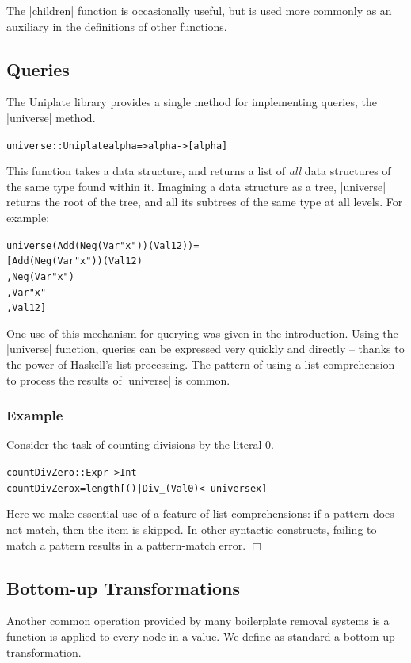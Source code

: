 \documentclass[preprint]{sigplanconf}
\newcounter{exmp}
\newcommand{\yesexample}{\subsubsection*{Example \arabic{exmp}}\refstepcounter{exmp}}
\newcommand{\noexample}{\hfill$\Box$}
\newenvironment{code}{\begin{alltt}\small}{\end{alltt}}
\newenvironment{example}{\yesexample}{\noexample}
\begin{document}
The |children| function is occasionally useful, but is used more commonly as an auxiliary in the definitions of other functions.


\subsection{Queries}

The Uniplate library provides a single method for implementing queries, the |universe| method.

\begin{code}
universe :: Uniplate alpha => alpha -> [alpha]
\end{code}

This function takes a data structure, and returns a list of \textit{all} data structures of the same type found within it. Imagining a data structure as a tree, |universe| returns the root of the tree, and all its subtrees of the same type at all levels. For example:

\begin{code}
universe (Add (Neg (Var "x")) (Val 12)) =
    [Add (Neg (Var "x")) (Val 12)
    ,Neg (Var "x")
    ,Var "x"
    ,Val 12]
\end{code}

One use of this mechanism for querying was given in the introduction. Using the |universe| function, queries can be expressed very quickly and directly -- thanks to the power of Haskell's list processing. The pattern of using a list-comprehension to process the results of |universe| is common.

\begin{example}
\label{ex:zerocount}
Consider the task of counting divisions by the literal 0.

\begin{code}
countDivZero :: Expr -> Int
countDivZero x = length [() | Div _ (Val 0) <- universe x]
\end{code}

Here we make essential use of a feature of list comprehensions: if a pattern does not match, then the item is skipped. In other syntactic constructs, failing to match a pattern results in a pattern-match error.
\end{example}

\subsection{Bottom-up Transformations}

Another common operation provided by many boilerplate removal systems \citep{lammel:syb,stratego,strafunski,ren:generic_recursion_toolbox} is a function is applied to every node in a value. We define as standard a bottom-up transformation.
\end{document}
